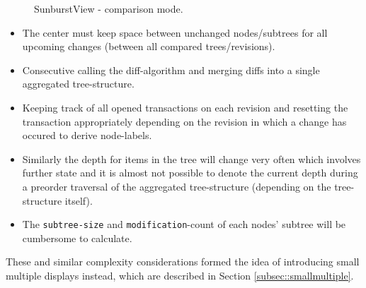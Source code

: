\begin{figure}[tb]
\caption{\label{fig:sunburst} SunburstView - comparison mode.}
\end{figure}

\begin{itemize}
\item The center must keep space between unchanged nodes/subtrees for all upcoming changes (between all compared trees/revisions).
\item Consecutive calling the diff-algorithm and merging diffs into a single aggregated tree-structure.
\item Keeping track of all opened transactions on each revision and resetting the transaction appropriately depending on the revision in which a change has occured to derive node-labels.
\item Similarly the depth for items in the tree will change very often which involves further state and it is almost not possible to denote the current depth during a preorder traversal of the aggregated tree-structure (depending on the tree-structure itself).
\item The \texttt{subtree-size} and \texttt{modification}-count of each nodes' subtree will be cumbersome to calculate.
\end{itemize}

These and similar complexity considerations formed the idea of introducing small multiple displays instead, which are described in Section \ref{subsec::smallmultiple}.

